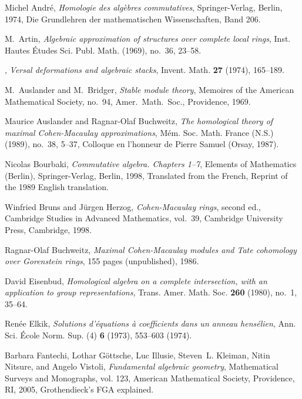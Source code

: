\documentclass[a4paper,10pt]{amsart}
\theoremstyle{plain}
\theoremstyle{definition}
\theoremstyle{remark}
\numberwithin{equation}{xx}
\begin{document}
\begin{thebibliography}{10}

Michel Andr{\'e}, \emph{Homologie des alg\`ebres commutatives},
  Springer-Verlag, Berlin, 1974, Die Grundlehren der mathematischen
  Wissenschaften, Band 206. 

M.~Artin, \emph{Algebraic approximation of structures over complete local
  rings}, Inst. Hautes \'Etudes Sci. Publ. Math. (1969), no.~36, 23--58.

\bysame, \emph{Versal deformations and algebraic stacks}, Invent. Math.
  \textbf{27} (1974), 165--189. 

M.\ Auslander and M.~Bridger, \emph{Stable module theory}, Memoires of the
  American Mathematical Society, no.~94, Amer.\ Math.\ Soc., Providence, 1969.

Maurice Auslander and Ragnar-Olaf Buchweitz, \emph{The homological theory of
  maximal {C}ohen-{M}acaulay approximations}, M\'em. Soc. Math. France (N.S.)
  (1989), no.~38, 5--37, Colloque en l'honneur de Pierre Samuel (Orsay, 1987).

Nicolas Bourbaki, \emph{Commutative algebra. {C}hapters 1--7}, Elements of
  Mathematics (Berlin), Springer-Verlag, Berlin, 1998, Translated from the
  French, Reprint of the 1989 English translation. 

Winfried Bruns and J{\"u}rgen Herzog, \emph{Cohen-{M}acaulay rings}, second
  ed., Cambridge Studies in Advanced Mathematics, vol.~39, Cambridge University
  Press, Cambridge, 1998.

Ragnar-Olaf Buchweitz, \emph{Maximal {C}ohen-{M}acaulay modules and {T}ate
  cohomology over {G}orenstein rings}, 155 pages (unpublished), 1986.

David Eisenbud, \emph{Homological algebra on a complete intersection, with an
  application to group representations}, Trans. Amer. Math. Soc. \textbf{260}
  (1980), no.~1, 35--64. 

Ren{\'e}e Elkik, \emph{Solutions d'\'equations \`a coefficients dans un anneau
  hens\'elien}, Ann. Sci. \'Ecole Norm. Sup. (4) \textbf{6} (1973), 553--603
  (1974). 

Barbara Fantechi, Lothar G{\"o}ttsche, Luc Illusie, Steven~L. Kleiman, Nitin
  Nitsure, and Angelo Vistoli, \emph{Fundamental algebraic geometry},
  Mathematical Surveys and Monographs, vol. 123, American Mathematical Society,
  Providence, RI, 2005, Grothendieck's FGA explained. 


\end{thebibliography}
\end{document}
